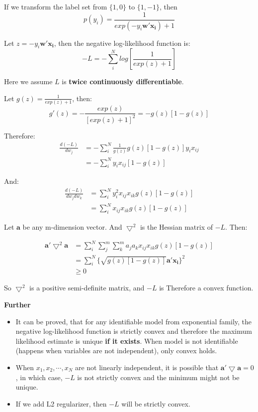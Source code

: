 \documentclass{article}
\newcommand{\V}[1]{\boldsymbol{#1}}
\newcommand{\TM}{\bigtriangledown}
\begin{document}
If we transform the label set from \(\{1, 0\}\) to \(\{1, -1\}\), then
\begin{equation}
p(y_i)=\frac{1}{exp(-y_i\V{w'}\V{x_i})+1}
\end{equation}

Let \(z=-y_i\V{w'}\V{x_i}\), then the negative log-likelihood function is:
\begin{equation}
-L=-\sum_{i}^{N}log[\frac{1}{exp(z)+1}]
\end{equation}

Here we assume \(L\) is \textbf{twice continuously differentiable}.

Let \(g(z)=\frac{1}{exp(z)+1}\), then:
\begin{equation}
g'(z)=-\frac{exp(z)}{[exp(z)+1]^2}=-g(z)[1-g(z)]
\end{equation}

Therefore:
\begin{equation}
\begin{aligned}
\frac{d(-L)}{dw_j}&=-\sum_{i}^N\frac{1}{g(z)}g(z)[1-g(z)]y_ix_{ij}\\
&=-\sum_{i}^Ny_ix_{ij}[1-g(z)]
\end{aligned}
\end{equation}

And:
\begin{equation}
\begin{aligned}
\frac{d(-L)}{dw_jdw_k}&=\sum_{i}^Ny_i^2x_{ij}x_{ik}g(z)[1-g(z)]\\
&=\sum_{i}^Nx_{ij}x_{ik}g(z)[1-g(z)]
\end{aligned}
\end{equation}

Let \(\V{a}\) be any m-dimension vector. And \(\TM^2\) is the Hessian matrix
of \(-L\). Then:

\begin{equation}
\begin{aligned}
\V{a'}\TM^2\V{a}&=\sum_{i}^N\sum_{j}^m\sum_{k}^ma_ja_kx_{ij}x_{ik}g(z)[1-g(z)]\\
&=\sum_{i}^N{\{\sqrt{g(z)[1-g(z)]}\V{a'}\V{x_i}\}^2}\\
&\geq 0
\end{aligned}
\end{equation}

So \(\TM^2\) is a positive semi-definite matrix, and \(-L\) is Therefore
a convex function.

\vspace{2mm}
\textbf{Further}
\begin{itemize}
\item It can be proved, that for any identifiable model from exponential family,
the negative log-likelihood function is strictly convex and therefore
the maximum likelihood estimate is unique \textbf{if it exists}. When model
is not identifiable (happens when variables are not independent), only
convex holds.
\item When \(x_1, x_2, \cdots, x_N\) are not linearly independent, it is possible
that \(\V{a'}\TM\V{a}=0\), in which case, \(-L\) is not strictly convex and
the minimum might not be unique.
\item If we add L2 regularizer, then \(-L\) will be strictly convex.
\end{itemize}
\end{document}
